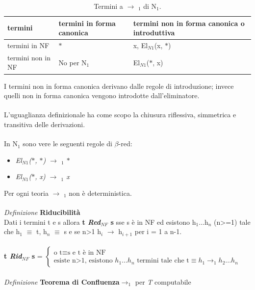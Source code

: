 \documentclass[10pt,a4paper, italian]{book}
\begin{document}
{{\begin{table}[H]
\centering
\begin{tabularx}{\textwidth}{XXX}
\hline 
\rowcolor{orange}
{\color[HTML]{FFFFFF}\textbf{termini}} & {\color[HTML]{FFFFFF} \textbf{termini in forma canonica}} & {\color[HTML]{FFFFFF}\textbf{termini non in forma canonica o introduttiva}}\\
\hline\hline
termini in NF & $\ast$ & x, El$_{N1}$(x, $\ast$)\\
termini non in NF & No per N$_1$ & El$_{N1}$($\ast$, x)\\
\end{tabularx}
\caption{\label{tab:termini-NF-nonNF-N1}Termini a $\rightarrow$ $_1$ di N$_1$.} 
\end{table}
\noindent
I termini non in forma canonica  derivano dalle regole di introduzione; invece quelli non in forma canonica vengono introdotte dall'eliminatore.\\\\
L'uguaglianza definizionale ha come scopo la chiusura riflessiva, simmetrica e transitiva delle derivazioni.\\\\
In N$_1$ sono vere le seguenti regole di $\beta$-red: 
\begin{itemize}
\item \textit{El$_{N1}$($\ast$, $\ast$) $\rightarrow$ $_1$ $\ast$}
\item \textit{El$_{N1}$($\ast$, x) $\rightarrow$ $_1$ x}
\end{itemize}
\noindent
Per ogni teoria  $\rightarrow$ $_1$ non \`e deterministica.
\\\\
\textit{Definizione} \textbf{Riducibilit\`a}\\
Dati i termini t e s allora \textbf{t \textit{Red$_{NF}$} s} sse s \`e in NF ed esistono h$_1$...h$_n$ (n>=1) tale che h$_1$ $\equiv$ t, h$_n$ $\equiv$ s e se n>1 h$_i$ $\rightarrow$ h$_{i+1}$ per i = 1 a n-1.\\\\
\textbf{t \textit{Rid$_{NF}$} s} =
$
\begin{cases}
\text{o t} \equiv \text{s e t è in NF} \\
\text{esiste n>1, esistono } h_1\text{...}h_n \text{ termini tale che t} \equiv h_1 \rightarrow _1 h_2 \text{...}h_n
\end{cases}
$
\\\\
\noindent
\textit{Definizione} \textbf{Teorema di Confluenza}$\rightarrow _1$ per \textit{T} computabile\\
}}
\end{document}
